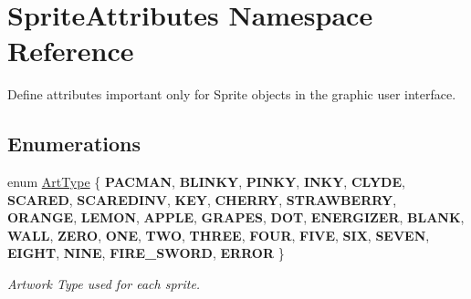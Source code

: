 \hypertarget{namespace_sprite_attributes}{}\section{Sprite\+Attributes Namespace Reference}
\label{namespace_sprite_attributes}


Define attributes important only for Sprite objects in the graphic user interface.  


\subsection*{Enumerations}
\begin{DoxyCompactItemize}
\item 
\mbox{\label{namespace_sprite_attributes_afb5447c311bc29f0ce8ddfd025c6e998}} 
enum \mbox{\hyperlink{namespace_sprite_attributes_afb5447c311bc29f0ce8ddfd025c6e998}{Art\+Type}} \{ \newline
{\bfseries P\+A\+C\+M\+AN}, 
{\bfseries B\+L\+I\+N\+KY}, 
{\bfseries P\+I\+N\+KY}, 
{\bfseries I\+N\+KY}, 
\newline
{\bfseries C\+L\+Y\+DE}, 
{\bfseries S\+C\+A\+R\+ED}, 
{\bfseries S\+C\+A\+R\+E\+D\+I\+NV}, 
{\bfseries K\+EY}, 
\newline
{\bfseries C\+H\+E\+R\+RY}, 
{\bfseries S\+T\+R\+A\+W\+B\+E\+R\+RY}, 
{\bfseries O\+R\+A\+N\+GE}, 
{\bfseries L\+E\+M\+ON}, 
\newline
{\bfseries A\+P\+P\+LE}, 
{\bfseries G\+R\+A\+P\+ES}, 
{\bfseries D\+OT}, 
{\bfseries E\+N\+E\+R\+G\+I\+Z\+ER}, 
\newline
{\bfseries B\+L\+A\+NK}, 
{\bfseries W\+A\+LL}, 
{\bfseries Z\+E\+RO}, 
{\bfseries O\+NE}, 
\newline
{\bfseries T\+WO}, 
{\bfseries T\+H\+R\+EE}, 
{\bfseries F\+O\+UR}, 
{\bfseries F\+I\+VE}, 
\newline
{\bfseries S\+IX}, 
{\bfseries S\+E\+V\+EN}, 
{\bfseries E\+I\+G\+HT}, 
{\bfseries N\+I\+NE}, 
\newline
{\bfseries F\+I\+R\+E\+\_\+\+S\+W\+O\+RD}, 
{\bfseries E\+R\+R\+OR}
 \}
\begin{DoxyCompactList}\small\item\em Artwork Type used for each sprite. \end{DoxyCompactList}\item 
\mbox{\label{namespace_sprite_attributes_a3ece96d6288b14d53d84e2138392395c}} 

\end{DoxyCompactItemize}
